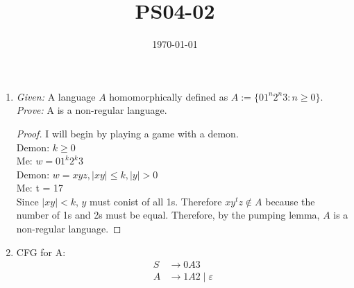 \documentclass{article}
\title{PS04-02}
\date{\today}
\begin{document}
\maketitle

\begin{enumerate}[label=\alph*.]
	\item \textit{Given: } A language $A$ homomorphically defined as $A := \{01^n2^n3 : n \geq 0\}$.\\
	\textit{Prove: } A is a non-regular language.
	\begin{proof}
	I will begin by playing a game with a demon.\\
	Demon: $k \geq 0$\\
	Me: $w = 01^k2^k3$\\
	Demon: $w = xyz, \mid xy \mid \leq k, \mid y \mid > 0$\\
	Me: t = 17\\
	Since $\mid xy \mid < k$, $y$ must conist of all 1s. Therefore $xy^tz \notin A$ because the number of 1s and 2s must be equal. Therefore, by the pumping lemma, $A$ is a non-regular language. 
	\end{proof}
	\item CFG for A:\\
	\begin{align*}
		S &\rightarrow 0A3\\
		A &\rightarrow 1A2 \mid \varepsilon
	\end{align*}
\end{enumerate}
\end{document}
